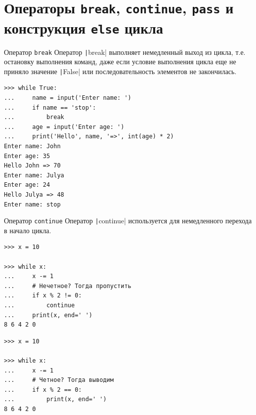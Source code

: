 \documentclass[aspectratio=169]{beamer}	%
\begin{document}
\section{Операторы \texttt{break}, \texttt{continue}, \texttt{pass} и \\ конструкция \texttt{else} цикла}
\sectionframe


\begin{frame}[fragile]{Оператор \texttt{break}}
\scriptsize
Оператор \texttt|break| выполняет немедленный выход из цикла, т.е. остановку выполнения команд, даже если условие выполнения цикла еще не приняло значение \texttt|False| или последовательность элементов не закончилась.

\begin{verbatim}
>>> while True:
...     name = input('Enter name: ')
...     if name == 'stop':
...         break
...     age = input('Enter age: ')
...     print('Hello', name, '=>', int(age) * 2)
Enter name: John
Enter age: 35
Hello John => 70
Enter name: Julya
Enter age: 24
Hello Julya => 48
Enter name: stop
\end{verbatim}
\vfill	
\end{frame}


\begin{frame}[fragile]{Оператор \texttt{continue}}
\scriptsize	
Оператор \texttt|continue| используется для немедленного перехода в начало цикла.

\begin{multicols}{2}

\begin{verbatim}
>>> x = 10

>>> while x:
...     x -= 1
...     # Нечетное? Тогда пропустить
...     if x % 2 != 0: 
...         continue  
...     print(x, end=' ')
8 6 4 2 0
\end{verbatim}

\columnbreak

\begin{verbatim}
>>> x = 10

>>> while x:
...     x -= 1
...     # Четное? Тогда выводим
...     if x % 2 == 0:   
...         print(x, end=' ')
8 6 4 2 0
\end{verbatim}

\end{multicols}
\vfill
\end{frame}
\end{document}
